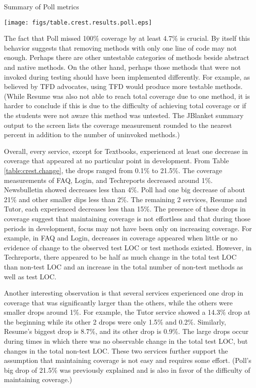 \begin{table}[htbp]
  \begin{center}
    \caption{Summary of Poll metrics}
    \texttt{[image: figs/table.crest.results.poll.eps]}
  \end{center}
\end{table}

The fact that Poll missed 100\% coverage by at least 4.7\% is crucial.  By
itself this behavior suggests that removing methods with only one line of
code may not enough.  Perhaps there are other untestable categories of
methods beside abstract and native methods.  On the other hand, perhaps
those methods that were not invoked during testing should have been
implemented differently.  For example, as believed by TFD advocates, using
TFD would produce more testable methods.  (While Resume was also not able
to reach total coverage due to one method, it is harder to conclude if this
is due to the difficulty of achieving total coverage or if the students
were not aware this method was untested.  The JBlanket summary output to
the screen lists the coverage measurement rounded to the nearest percent in
addition to the number of uninvoked methods.)

Overall, every service, except for Textbooks, experienced at least one
decrease in coverage that appeared at no particular point in development.
From Table \ref{table:crest.change}, the drops ranged from 0.1\% to 21.5\%.
The coverage measurements of FAQ, Login, and Techreports decreased around
1\%.  Newsbulletin showed decreases less than 4\%.  Poll had one big
decrease of about 21\% and other smaller dips less than 2\%.  The remaining
2 services, Resume and Tutor, each experienced decreases less than 15\%.
The presence of these drops in coverage suggest that maintaining coverage
is not effortless and that during those periods in development, focus may
not have been only on increasing coverage.  For example, in FAQ and Login,
decreases in coverage appeared when little or no evidence of change to the
observed test LOC or test methods existed.  However, in Techreports, there
appeared to be half as much change in the total test LOC than non-test LOC
and an increase in the total number of non-test methods as well as test
LOC.

Another interesting observation is that several services experienced one
drop in coverage that was significantly larger than the others, while the
others were smaller drops around 1\%.  For example, the Tutor service
showed a 14.3\% drop at the beginning while its other 2 drops were only
1.5\% and 0.2\%.  Similarly, Resume's biggest drop is 8.7\%, and its other
drop is 0.9\%.  The large drops occur during times in which there was no
observable change in the total test LOC, but changes in the total non-test
LOC.  These two services further support the assumption that maintaining
coverage is not easy and requires some effort.  (Poll's big drop of 21.5\%
was previously explained and is also in favor of the difficulty of
maintaining coverage.)

